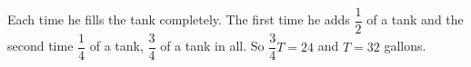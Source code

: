 Each time he fills the tank completely. The first time he adds $\dfrac12$ of a tank and the second time $\dfrac14$ of a tank, $\dfrac34$ of a tank in all. So $\dfrac34T=24$ and $T=\boxed{32}$ gallons.
